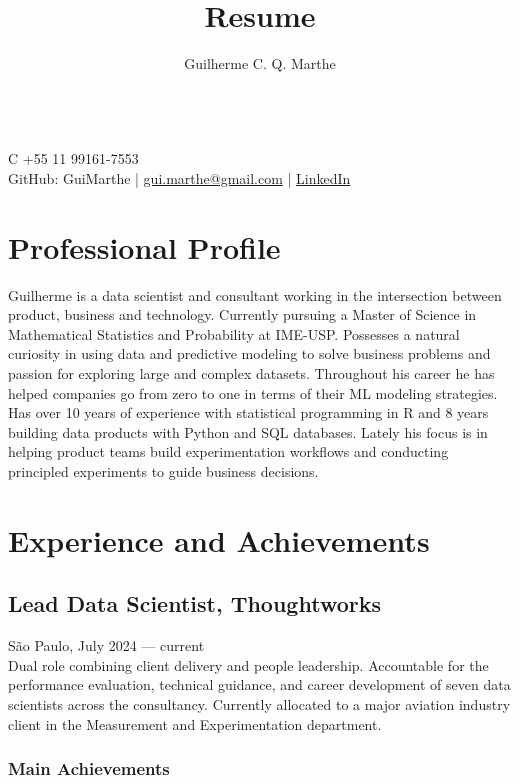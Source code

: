 \documentclass{article}
\author{Guilherme C. Q. Marthe}
\title{Resume}
\makeatletter
\renewcommand{\maketitle}{
\begin{flushleft}
	{\huge\theauthor}
	\vspace{0.2em}\\
	C +55 11 99161-7553\\
	GitHub: GuiMarthe | \href{mailto:gui.marthe@gmail.com}{gui.marthe@gmail.com} | \href{https://www.linkedin.com/in/gui42/}{LinkedIn}
\end{flushleft}
}
\newcommand{\jobdate}[3]{
\large
\vspace{0.05em} 
  {#1, #2 --- #3}
\vspace{0.5em} 
\\
}
\makeatother
\begin{document}
\maketitle

\section{Professional Profile}

 \linespread{.99}\large{
Guilherme is a data scientist and consultant working in the intersection between product, business and technology. Currently pursuing a Master of Science in Mathematical Statistics and Probability at IME-USP. Possesses a natural curiosity in using data and predictive modeling to solve business problems and passion for exploring large and complex datasets. Throughout his career he has helped companies go from zero to one in terms of their ML modeling strategies. Has over 10 years of experience with statistical programming in R and 8 years building data products with Python and SQL databases. Lately his focus is in helping product teams build experimentation workflows and conducting principled experiments to guide business decisions.
 }


\section{Experience and Achievements}

\subsection{Lead Data Scientist, Thoughtworks}
\jobdate{São Paulo}{July 2024}{current}
Dual role combining client delivery and people leadership. Accountable for the performance evaluation, technical guidance, and career development of seven data scientists across the consultancy. Currently allocated to a major aviation industry client in the Measurement and Experimentation department.
\subsubsection{Main Achievements}
\end{document}
